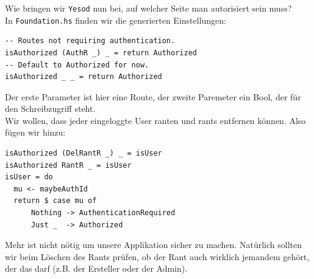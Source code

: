 \documentclass{beamer}
\begin{document}
\begin{frame}[fragile]
Wie bringen wir \texttt{Yesod} nun bei, auf welcher Seite man autorisiert sein muss?\\\pause
In \texttt{Foundation.hs} finden wir die generierten Einstellungen:
\begin{verbatim}
-- Routes not requiring authentication.
isAuthorized (AuthR _) _ = return Authorized
-- Default to Authorized for now.
isAuthorized _ _ = return Authorized
\end{verbatim}
\pause
Der erste Parameter ist hier eine Route, der zweite Paremeter ein Bool, der für den Schreibzugriff steht.\\\pause
Wir wollen, dass jeder eingeloggte User ranten und rants entfernen können. Also fügen wir hinzu:
\begin{verbatim}
isAuthorized (DelRantR _) _ = isUser
isAuthorized RantR _ = isUser
isUser = do
  mu <- maybeAuthId
  return $ case mu of
      Nothing -> AuthenticationRequired
      Just _  -> Authorized
\end{verbatim}
\end{frame}

\begin{frame}
Mehr ist nicht nötig um unsere Applikation sicher zu machen. Natürlich sollten wir beim Löschen des Rants prüfen, ob der Rant auch wirklich jemandem gehört, der das darf (z.B. der Ersteller oder der Admin).
\end{frame}
\end{document}
